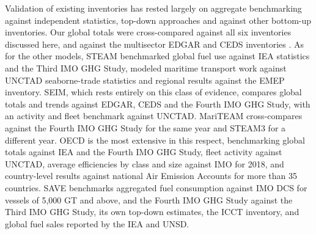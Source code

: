Validation of existing inventories has rested largely on aggregate benchmarking against independent statistics, top-down approaches and against other bottom-up inventories. Our global totals were cross-compared against all six inventories discussed here, and against the multisector EDGAR and CEDS inventories \cite{guizzardiGlobalUptoDate2025, hoeslyHistorical17502014Anthropogenic2018}. As for the other models, STEAM benchmarked global fuel use against IEA statistics and the Third IMO GHG Study, modeled maritime transport work against UNCTAD seaborne-trade statistics and regional results against the EMEP inventory. SEIM, which rests entirely on this class of evidence, compares global totals and trends against EDGAR, CEDS and the Fourth IMO GHG Study, with an activity and fleet benchmark against UNCTAD. MariTEAM cross-compares against the Fourth IMO GHG Study for the same year and STEAM3 for a different year. OECD is the most extensive in this respect, benchmarking global totals against IEA and the Fourth IMO GHG Study, fleet activity against UNCTAD, average efficiencies by class and size against IMO for 2018, and country-level results against national Air Emission Accounts for more than 35 countries. SAVE benchmarks aggregated fuel consumption against IMO DCS for vessels of 5,000 GT and above, and the Fourth IMO GHG Study against the Third IMO GHG Study, its own top-down estimates, the ICCT inventory, and global fuel sales reported by the IEA and UNSD.

